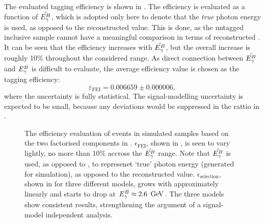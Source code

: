 The evaluated tagging efficiency is shown in .
The efficiency is evaluated as a function of $\tilde{{E^B_{\gamma}}}$, which is adopted only here to denote that the \textit{true} photon energy is used, 
as opposed to the reconstructed value.
This is done, as the untagged inclusive sample cannot have a meaningful comparison in terms of reconstructed \EB.
It can be seen that the efficiency increases with $\tilde{{E^B_{\gamma}}}$, but the overall increase is roughly 10\% throughout the considered range.
As direct connection between $\tilde{{E^B_{\gamma}}}$ and ${E^B_{\gamma}}$ is difficult to evaluate, the average efficiency value is chosen as the tagging efficiency:
\begin{equation}\label{eq:avg_efficiency_fei}
    \varepsilon_{\mathrm{FEI}} = 0.006659 \pm 0.000006,
\end{equation}
where the uncertainty is fully statistical.
The signal-modelling uncertainty is expected to be small, because any deviations would be suppressed in the rattio in .
\begin{figure}[htbp!]
    \centering
    \caption{\label{fig:epsilon} The efficiency evaluation of \BtoXsgamma events in simulated samples based on the two factorised components in
    .
    $\epsilon_{\mathrm{FEI}}$, shown in , is seen to vary lightly, no more than 10\% accross the $\tilde{{E^B_{\gamma}}}$ range.
    Note that $\tilde{{E^B_{\gamma}}}$ is used, as opposed to \EB, to represenet `true' photon energy (generated for simulation), 
    as opposed to the reconstructed value.
    $\epsilon_{\mathrm{selection}}$, shown in  for three different models,
    grows with \EB approximately linearly and starts to drop at ${E^B_{\gamma}}\approx2.6~\mathrm{\,Ge\kern -0.1em V}$.
    The three models show consistent results, strengthening the argument of a signal-model independent analysis.
    }
\end{figure}

